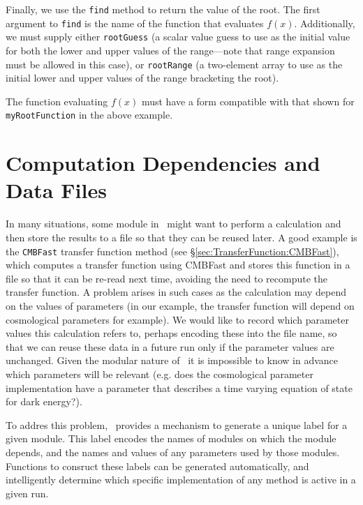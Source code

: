 Finally, we use the {\tt find} method to return the value of the root. The first argument to {\tt find} is the name of the function that evaluates $f(x)$. Additionally, we must supply either {\tt rootGuess} (a scalar value guess to use as the initial value for both the lower and upper values of the range---note that range expansion must be allowed in this case), or {\tt rootRange} (a two-element array to use as the initial lower and upper values of the range bracketing the root).

The function evaluating $f(x)$ must have a form compatible with that shown for {\tt myRootFunction} in the above example.

\section{Computation Dependencies and Data Files}

In many situations, some module in \glc\ might want to perform a calculation and then store the results to a file so that they can be reused later. A good example is the {\tt CMBFast} transfer function method (see \S\ref{sec:TransferFunction:CMBFast}), which computes a transfer function using {\sc CMBFast} and stores this function in a file so that it can be re-read next time, avoiding the need to recompute the transfer function. A problem arises in such cases as the calculation may depend on the values of parameters (in our example, the transfer function will depend on cosmological parameters for example). We would like to record which parameter values this calculation refers to, perhaps encoding these into the file name, so that we can reuse these data in a future run only if the parameter values are unchanged. Given the modular nature of \glc\ it is impossible to know in advance which parameters will be relevant (e.g. does the cosmological parameter implementation have a parameter that describes a time varying equation of state for dark energy?). 

To addres this problem, \glc\ provides a mechanism to generate a unique label for a given module. This label encodes the names of modules on which the module depends, and the names and values of any parameters used by those modules. Functions to consruct these labels can be generated automatically, and intelligently determine which specific implementation of any method is active in a given run.

